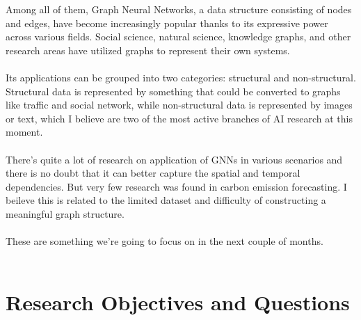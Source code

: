 \documentclass[light]{lutbeamer} %
\begin{document}
\begin{frame}
{        Among all of them, Graph Neural Networks, a data structure consisting of nodes and edges, have become increasingly popular thanks to its expressive power across various fields. Social science, natural science, knowledge graphs, and other research areas have utilized graphs to represent their own systems. \\~\\
        Its applications can be grouped into two categories: structural and non-structural. Structural data is represented by something that could be converted to graphs like traffic and social network, while non-structural data is represented by images or text, which I believe are two of the most active branches of AI research at this moment. \\~\\
        There's quite a lot of research on application of GNNs in various scenarios and there is no doubt that it can better capture the spatial and temporal dependencies. But very few research was found in carbon emission forecasting. I beileve this is related to the limited dataset and difficulty of constructing a meaningful graph structure. \\~\\
        
        These are something we're going to focus on in the next couple of months. \\~\\
    }

\end{frame}

\section{Research Objectives and Questions}
\end{document}
